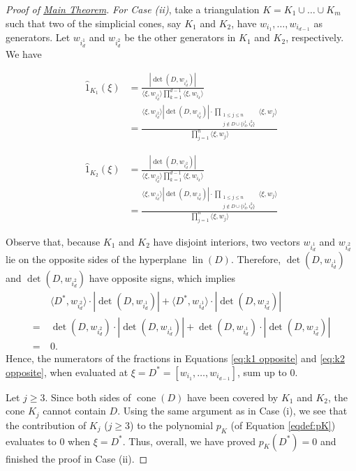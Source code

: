 \documentclass{article}
\DeclareMathOperator{\cone}{cone}
\DeclareMathOperator{\lin}{lin}
\begin{document}
\begin{proof}[Proof of \texorpdfstring{\hyperref[thm:MAIN]{Main Theorem}}{Main Theorem}]
    \medskip
		
	\emph{For Case (ii)}, take a triangulation $K = K_1 \cup \dots \cup K_m$ such that two of the simplicial cones, say $K_1$ and $K_2$, have $w_{i_1}, \dots, w_{i_{d-1}}$ as generators. Let $w_{i^1_d}$ and $w_{i^2_d}$ be the other generators in $K_1$ and $K_2$, respectively. We have
		
	\begin{align} 
        \hat{1}_{K_1}(\xi) &= \frac{|\det(D, w_{i^1_d})|}{\langle \xi, w_{i^1_d} \rangle \prod_{k=1}^{d-1} \langle \xi, w_{i_k} \rangle} \nonumber \\
        	&= \frac{\langle \xi, w_{i^2_d} \rangle |\det(D, w_{i^1_d})| \cdot \prod_{\substack{1 \leq j \leq n \\ j \notin D \cup \{i^1_d,i^2_d\}}} \langle \xi, w_{j}\rangle}{\prod_{j=1}^n \langle \xi, w_{j} \rangle} \label{eq:k1 opposite}
	\end{align}
    
    \begin{align}
        \hat{1}_{K_2}(\xi) &= \frac{|\det(D, w_{i^2_d})|}{\langle \xi, w_{i^2_d} \rangle \prod_{k=1}^{d-1} \langle \xi, w_{i_k} \rangle} \nonumber \\
        	&= \frac{\langle \xi, w_{i^1_d} \rangle |\det(D, w_{i^2_d})| \cdot \prod_{\substack{1 \leq j \leq n \\ j \notin D \cup \{i^1_d,i^2_d\}}} \langle \xi, w_{j}\rangle}{\prod_{j=1}^n \langle \xi, w_{j} \rangle} \label{eq:k2 opposite}
	\end{align}
		
		Observe that, because $K_1$ and $K_2$ have disjoint interiors, two vectors $w_{i^1_d}$ and $w_{i^2_d}$ lie on the opposite sides of the hyperplane $\lin(D)$. Therefore, $\det(D, w_{i^1_d})$ and $\det(D, w_{i^2_d})$ have opposite signs, which implies
	\begin{align}
		& \langle D^*, w_{i^2_d} \rangle \cdot |\det(D, w_{i^1_d})| + \langle D^*, w_{i^1_d} \rangle \cdot |\det(D, w_{i^2_d})| \nonumber \\ 
        =\ & \det(D, w_{i^2_d}) \cdot |\det(D, w_{i^1_d})| + \det(D, w_{i^1_d}) \cdot |\det(D, w_{i^2_d})| \nonumber \\
        =\ & 0.
	\end{align}
    Hence, the numerators of the fractions in Equations \ref{eq:k1 opposite} and \ref{eq:k2 opposite}, when evaluated at $\xi = D^* = [w_{i_1}, \dots, w_{i_{d-1}}]$, sum up to $0$.
		
	Let $j \geq 3$. Since both sides of $\cone(D)$ have been covered by $K_1$ and $K_2$, the cone $K_j$ cannot contain $D$. Using the same argument as in Case (i), we see that the contribution of $K_j$ ($j \geq 3$) to the polynomial $p_K$ (of Equation \ref{eqdef:pK}) evaluates to $0$ when $\xi=D^*$. Thus, overall, we have proved $p_K(D^*) = 0$ and finished the proof in Case (ii).
\end{proof}
\end{document}
